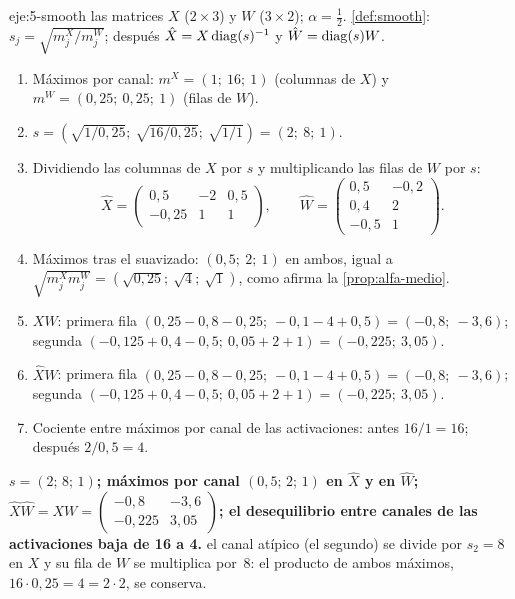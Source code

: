 \begin{solucion}{eje:5-smooth}
\datos las matrices $X$ ($2\times 3$) y $W$ ($3\times 2$); $\alpha=\frac12$.
\planteamiento \cref{def:smooth}: $s_j=\sqrt{m^{X}_{j}/m^{W}_{j}}$; después $\hat X=X\operatorname{diag}(s)^{-1}$ y $\hat W=\operatorname{diag}(s)W$.
\pasos
\begin{enumerate}[label=\arabic*.]
  \item Máximos por canal: $m^{X}=(1;\allowbreak\ 16;\allowbreak\ 1)$ (columnas de $X$) y $m^{W}=(0{,}25;\allowbreak\ 0{,}25;\allowbreak\ 1)$ (filas de $W$).
  \item $s=(\sqrt{1/0{,}25};\allowbreak\ \sqrt{16/0{,}25};\allowbreak\ \sqrt{1/1})=(2;\allowbreak\ 8;\allowbreak\ 1)$.
  \item Dividiendo las columnas de $X$ por $s$ y multiplicando las filas de $W$ por $s$:
  \[
  \hat X=\begin{pmatrix}0{,}5 & -2 & 0{,}5\\ -0{,}25 & 1 & 1\end{pmatrix},\qquad
  \hat W=\begin{pmatrix}0{,}5 & -0{,}2\\ 0{,}4 & 2\\ -0{,}5 & 1\end{pmatrix}.
  \]
  \item Máximos tras el suavizado: $(0{,}5;\allowbreak\ 2;\allowbreak\ 1)$ en ambos, igual a $\sqrt{m^{X}_{j}m^{W}_{j}}=(\sqrt{0{,}25};\allowbreak\ \sqrt{4};\allowbreak\ \sqrt{1})$, como afirma la \cref{prop:alfa-medio}.
  \item $XW$: primera fila $(0{,}25-0{,}8-0{,}25;\allowbreak\ -0{,}1-4+0{,}5)=(-0{,}8;\allowbreak\ -3{,}6)$; segunda $(-0{,}125+0{,}4-0{,}5;\allowbreak\ 0{,}05+2+1)=(-0{,}225;\allowbreak\ 3{,}05)$.
  \item $\hat X\hat W$: primera fila $(0{,}25-0{,}8-0{,}25;\allowbreak\ -0{,}1-4+0{,}5)=(-0{,}8;\allowbreak\ -3{,}6)$; segunda $(-0{,}125+0{,}4-0{,}5;\allowbreak\ 0{,}05+2+1)=(-0{,}225;\allowbreak\ 3{,}05)$.
  \item Cociente entre máximos por canal de las activaciones: antes $16/1=16$; después $2/0{,}5=4$.
\end{enumerate}
\resultado \textbf{$s=(2;\allowbreak\,8;\allowbreak\,1)$; máximos por canal $(0{,}5;\allowbreak\,2;\allowbreak\,1)$ en $\hat X$ y en $\hat W$; $\hat X\hat W=XW=\begin{pmatrix}-0{,}8 & -3{,}6\\ -0{,}225 & 3{,}05\end{pmatrix}$; el desequilibrio entre canales de las activaciones baja de 16 a 4.}
\comprobacion el canal atípico (el segundo) se divide por $s_2=8$ en $X$ y su fila de $W$ se multiplica por~8: el producto de ambos máximos, $16\cdot 0{,}25=4=2\cdot 2$, se conserva.
\end{solucion}

